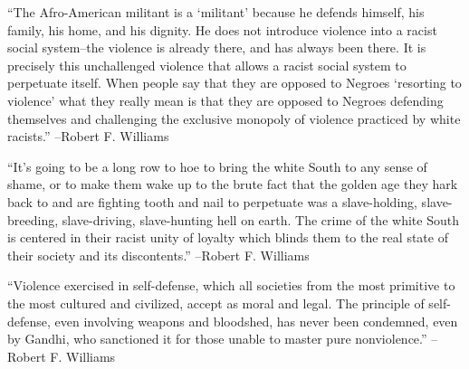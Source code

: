 \documentclass{article}%
\begin{document}
\vspace{1mm}%
\begin{minipage}{\textwidth}%
\flushleft%
“The Afro{-}American militant is a ‘militant’ because he defends himself, his family, his home, and his dignity. He does not introduce violence into a racist social system–the violence is already there, and has always been there. It is precisely this unchallenged violence that allows a racist social system to perpetuate itself. When people say that they are opposed to Negroes ‘resorting to violence’ what they really mean is that they are opposed to Negroes defending themselves and challenging the exclusive monopoly of violence practiced by white racists.”%
\linebreak%
\vspace{1mm}%
–Robert F. Williams%
\linebreak%
\vspace{1mm}%
\end{minipage}%
\linebreak%
\vspace{1mm}%
\begin{minipage}{\textwidth}%
\flushleft%
“It's going to be a long row to hoe to bring the white South to any sense of shame, or to make them wake up to the brute fact that the golden age they hark back to and are fighting tooth and nail to perpetuate was a slave{-}holding, slave{-}breeding, slave{-}driving, slave{-}hunting hell on earth. The crime of the white South is centered in their racist unity of loyalty which blinds them to the real state of their society and its discontents.”%
\linebreak%
\vspace{1mm}%
–Robert F. Williams%
\linebreak%
\vspace{1mm}%
\end{minipage}%
\linebreak%
\vspace{1mm}%
\begin{minipage}{\textwidth}%
\flushleft%
“Violence exercised in self{-}defense, which all societies from the most primitive to the most cultured and civilized, accept as moral and legal. The principle of self{-}defense, even involving weapons and bloodshed, has never been condemned, even by Gandhi, who sanctioned it for those unable to master pure nonviolence.”%
\linebreak%
\vspace{1mm}%
–Robert F. Williams%
\linebreak%
\vspace{1mm}%
\end{minipage}%
\end{document}
